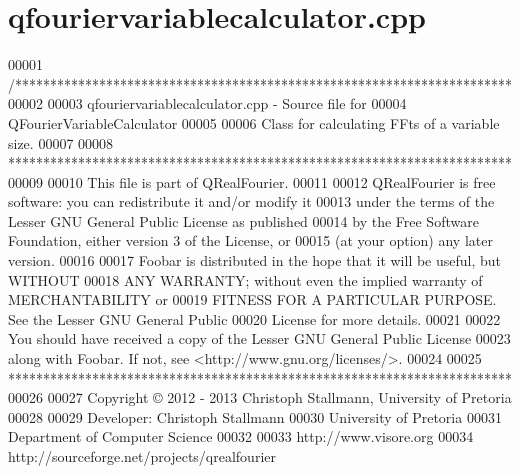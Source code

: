 \hypertarget{a00123_source}{\section{qfouriervariablecalculator.\+cpp}
\label{a00123_source}
}

\begin{DoxyCode}
00001 \textcolor{comment}{/***********************************************************************}
00002 \textcolor{comment}{}
00003 \textcolor{comment}{qfouriervariablecalculator.cpp - Source file for}
00004 \textcolor{comment}{                                 QFourierVariableCalculator}
00005 \textcolor{comment}{}
00006 \textcolor{comment}{Class for calculating FFts of a variable size.}
00007 \textcolor{comment}{}
00008 \textcolor{comment}{************************************************************************}
00009 \textcolor{comment}{}
00010 \textcolor{comment}{This file is part of QRealFourier.}
00011 \textcolor{comment}{}
00012 \textcolor{comment}{QRealFourier is free software: you can redistribute it and/or modify it}
00013 \textcolor{comment}{under the terms of the Lesser GNU General Public License as published}
00014 \textcolor{comment}{by the Free Software Foundation, either version 3 of the License, or}
00015 \textcolor{comment}{(at your option) any later version.}
00016 \textcolor{comment}{}
00017 \textcolor{comment}{Foobar is distributed in the hope that it will be useful, but WITHOUT}
00018 \textcolor{comment}{ANY WARRANTY; without even the implied warranty of MERCHANTABILITY or}
00019 \textcolor{comment}{FITNESS FOR A PARTICULAR PURPOSE.  See the Lesser GNU General Public}
00020 \textcolor{comment}{License for more details.}
00021 \textcolor{comment}{}
00022 \textcolor{comment}{You should have received a copy of the Lesser GNU General Public License}
00023 \textcolor{comment}{along with Foobar.  If not, see <http://www.gnu.org/licenses/>.}
00024 \textcolor{comment}{}
00025 \textcolor{comment}{************************************************************************}
00026 \textcolor{comment}{}
00027 \textcolor{comment}{Copyright © 2012 - 2013 Christoph Stallmann, University of Pretoria}
00028 \textcolor{comment}{}
00029 \textcolor{comment}{Developer: Christoph Stallmann}
00030 \textcolor{comment}{University of Pretoria}
00031 \textcolor{comment}{Department of Computer Science}
00032 \textcolor{comment}{}
00033 \textcolor{comment}{http://www.visore.org}
00034 \textcolor{comment}{http://sourceforge.net/projects/qrealfourier}

\end{DoxyCode}
